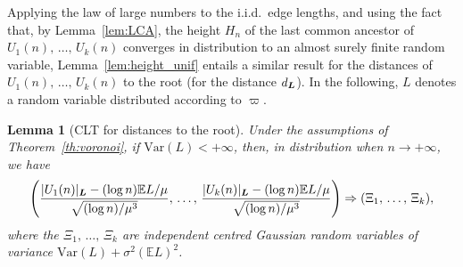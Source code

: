 \documentclass[10pt]{amsart}
\newtheorem{lemm}[theo]{Lemma}\newtheorem{prop}[theo]{Proposition}\newtheorem{coro}[theo]{Corollary}\newtheorem{conj}[theo]{Conjecture}
\theoremstyle{definition}\newtheorem{defi}[theo]{Definition}\newtheorem{rema}[theo]{Remark}\newtheorem{exam}[theo]{Example}\newtheorem{exem}[theo]{Example}\newtheorem{nota}[theo]{Notation}
\newcommand{\bs}{\ensuremath{\boldsymbol}}
\newcommand{\bbE}{\mathbb{E}}
\newcommand{\Var}{\mathrm{Var}}
\begin{document}
Applying the law of large numbers to the i.i.d.\ edge lengths, and using the fact that, by Lemma~\ref{lem:LCA}, the height $H_n$ of the last common ancestor of $U_1(n),\,\ldots,\,U_k(n)$ converges in distribution to an almost surely finite random variable, Lemma~\ref{lem:height_unif} entails a similar result for the distances of $U_1(n),\,\ldots,\,U_k(n)$ to the root (for the distance $d_{\bs L}$). In the following, $L$ denotes a random variable distributed according to $\varpi.$

\begin{lemm}[CLT for distances to the root]\label{lem:real_heights_finite_var}
Under the assumptions of Theorem~\ref{th:voronoi}, if $\Var(L)<+\infty$, then, in distribution when $n\to+\infty$, we have
\[
\left(\frac{|U_1(n)|_{\bs L} - (\log n)\bbE L/\mu}{\sqrt{(\log n)/\mu^3}},\,\ldots,\,
\frac{|U_k(n)|_{\bs L} - (\log n)\bbE L/\mu}{\sqrt{(\log n)/\mu^3}}
\right)\Rightarrow (\Xi_1, \,\ldots,\, \Xi_k),
\]
where the $\Xi_1,\, \ldots, \,\Xi_k$ are independent centred Gaussian random variables of variance $\Var(L)+\sigma^2(\bbE L)^2$.
\end{lemm}
\end{document}
